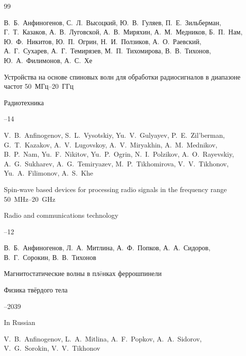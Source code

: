 \begin{thebibliography}{99}




\by В.~Б.~Анфиногенов, С.~Л.~Высоцкий, Ю.~В.~Гуляев, П.~Е.~Зильберман, Г.~Т.~Казаков, А.~В.~Луговской, А.~В.~Миряхин, А.~М.~Медников, Б.~П.~Нам, Ю.~Ф.~Никитов, Ю.~П.~Огрин, Н.~И.~Ползиков, А.~О.~Раевский, А.~Г.~Сухарев, А.~Г.~Темирязев,  М.~П.~Тихомирова, В.~В.~Тихонов, Ю.~А.~Филимонов, А.~С.~Хе

\paper Устройства на основе спиновых волн для обработки радиосигналов в диапазоне частот 50~МГц--20~ГГц

\jour Радиотехника



--14

\transl

\by V.~B.~Anfinogenov, S.~L.~Vysotskiy, Yu.~V.~Gulyayev, P.~E.~Zil'berman, G.~T.~Kazakov, A.~V.~Lugovskoy, A.~V.~Miryakhin, A.~M.~Mednikov, B.~P.~Nam, Yu.~F.~Nikitov, Yu.~P.~Ogrin, N.~I.~Polzikov, A.~O.~Rayevskiy, A.~G.~Sukharev, A.~G.~Temiryazev, M.~P.~Tikhomirova, V.~V.~Tikhonov, Yu.~A.~Filimonov, A.~S.~Khe

\paper Spin-wave based devices for processing radio signals in the frequency range 50~MHz--20~GHz

\jour Radio and communications technology




--12






\by В.~Б.~Анфиногенов, Л.~А.~Митлина, А.~Ф.~Попков, А.~А.~Сидоров, В.~Г.~Сорокин, В.~В.~Тихонов

\paper Магнитостатические волны в пл\"eнках феррошпинели

\jour Физика твёрдого тела




--2039

\misctransl

\lang In Russian

\by V.~B.~Anfinogenov, L.~A.~Mitlina, A.~F.~Popkov, A.~A.~Sidorov, V.~G.~Sorokin, V.~V.~Tikhonov


\end{thebibliography}
